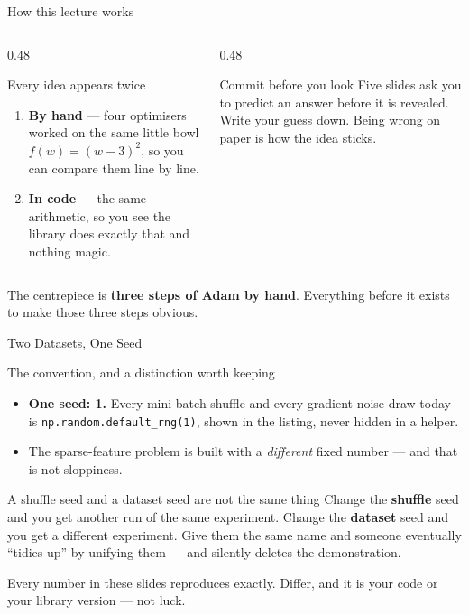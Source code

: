 \documentclass[aspectratio=169]{beamer}
\begin{document}
\begin{frame}[shrink=6]{How this lecture works}
  \begin{columns}[T]
    \begin{column}{0.48\textwidth}
      \begin{block}{Every idea appears twice}
        \begin{enumerate}
          \item \textbf{By hand} --- four optimisers worked on the same little
            bowl $f(w)=(w-3)^2$, so you can compare them line by line.
          \item \textbf{In code} --- the same arithmetic, so you see the library
            does exactly that and nothing magic.
        \end{enumerate}
      \end{block}
    \end{column}
    \begin{column}{0.48\textwidth}
      \begin{alertblock}{Commit before you look}
        Five slides ask you to predict an answer before it is revealed. Write
        your guess down. Being wrong on paper is how the idea sticks.
      \end{alertblock}
    \end{column}
  \end{columns}
  \vspace{0.4em}
  \begin{center}
    \small The centrepiece is \textbf{three steps of Adam by hand}. Everything
    before it exists to make those three steps obvious.
  \end{center}
\end{frame}

\begin{frame}[fragile,shrink=10]{Two Datasets, One Seed}
  \begin{block}{The convention, and a distinction worth keeping}
    \small
    \begin{itemize}
      \item \textbf{One seed: 1.} Every mini-batch shuffle and every
        gradient-noise draw today is \texttt{np.random.default\_rng(1)},
        shown in the listing, never hidden in a helper.
      \item The sparse-feature problem is built with a \emph{different} fixed
        number --- and that is not sloppiness.
    \end{itemize}
  \end{block}
  \begin{alertblock}{A shuffle seed and a dataset seed are not the same thing}
    \small Change the \textbf{shuffle} seed and you get another run of the same
    experiment. Change the \textbf{dataset} seed and you get a different
    experiment. Give them the same name and someone eventually ``tidies up''
    by unifying them --- and silently deletes the demonstration.
  \end{alertblock}
  {\footnotesize Every number in these slides reproduces exactly. Differ, and
  it is your code or your library version --- not luck.}
\end{frame}
\end{document}
